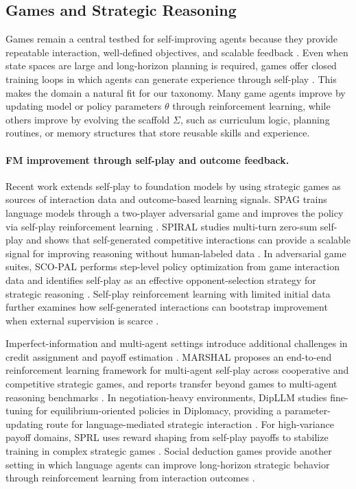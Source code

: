\subsection{Games and Strategic Reasoning}

Games remain a central testbed for self-improving agents because they provide repeatable interaction, well-defined objectives, and scalable feedback \citep{stanic2023learning}. Even when state spaces are large and long-horizon planning is required, games offer closed training loops in which agents can generate experience through self-play \citep{silver2018general, silver2017masteringchessshogiselfplay, Schrittwieser_2020, openai2019dota2largescale}. This makes the domain a natural fit for our taxonomy. Many game agents improve by updating model or policy parameters $\theta$ through reinforcement learning, while others improve by evolving the scaffold $\Sigma$, such as curriculum logic, planning routines, or memory structures that store reusable skills and experience.

\paragraph{FM improvement through self-play and outcome feedback.}
Recent work extends self-play to foundation models by using strategic games as sources of interaction data and outcome-based learning signals. SPAG trains language models through a two-player adversarial game and improves the policy via self-play reinforcement learning \citep{cheng2025selfplayingadversariallanguagegame}. SPIRAL studies multi-turn zero-sum self-play and shows that self-generated competitive interactions can provide a scalable signal for improving reasoning without human-labeled data \citep{liu2025spiralselfplayzerosumgames}. In adversarial game suites, SCO-PAL performs step-level policy optimization from game interaction data and identifies self-play as an effective opponent-selection strategy for strategic reasoning \citep{zhang2025enhancinglanguageagentstrategic}. Self-play reinforcement learning with limited initial data further examines how self-generated interactions can bootstrap improvement when external supervision is scarce \citep{fang2025serl}.

Imperfect-information and multi-agent settings introduce additional challenges in credit assignment and payoff estimation \citep{zhuge2023mindstorms, stanic2023learning}. MARSHAL proposes an end-to-end reinforcement learning framework for multi-agent self-play across cooperative and competitive strategic games, and reports transfer beyond games to multi-agent reasoning benchmarks \citep{yuan2026mars}. In negotiation-heavy environments, DipLLM studies fine-tuning for equilibrium-oriented policies in Diplomacy, providing a parameter-updating route for language-mediated strategic interaction \citep{xu2025dipllmfinetuningllmstrategic}. For high-variance payoff domains, SPRL uses reward shaping from self-play payoffs to stabilize training in complex strategic games \citep{anonymous2025llm}. Social deduction games provide another setting in which language agents can improve long-horizon strategic behavior through reinforcement learning from interaction outcomes \citep{xu2025languageagentsreinforcementlearning}.

